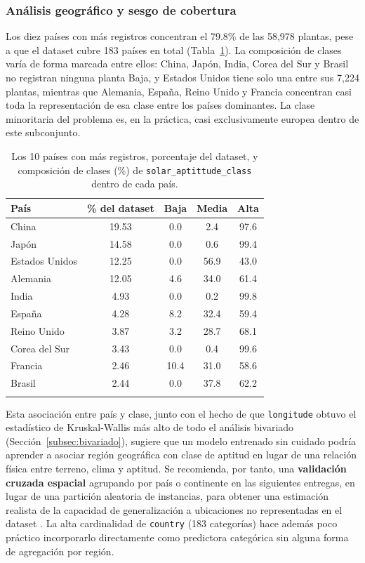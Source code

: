 \documentclass[pdflatex,sn-mathphys-num]{sn-jnl}
\begin{document}
\subsubsection{Análisis geográfico y sesgo de cobertura}\label{subsec:geografico}

Los diez países con más registros concentran el 79.8\% de las 58{,}978 plantas, pese a que el dataset cubre 183 países en total (Tabla~\ref{tab:paises}). La composición de clases varía de forma marcada entre ellos: China, Japón, India, Corea del Sur y Brasil no registran ninguna planta Baja, y Estados Unidos tiene solo una entre sus 7{,}224 plantas, mientras que Alemania, España, Reino Unido y Francia concentran casi toda la representación de esa clase entre los países dominantes. La clase minoritaria del problema es, en la práctica, casi exclusivamente europea dentro de este subconjunto.

\begin{table}[h]
\caption{Los 10 países con más registros, porcentaje del dataset, y composición de clases (\%) de \texttt{solar\_aptittude\_class} dentro de cada país.}\label{tab:paises}
\begin{tabular}{@{}lcccc@{}}
\toprule
País & \% del dataset & Baja & Media & Alta \\
\midrule
China          & 19.53 & 0.0  & 2.4  & 97.6 \\
Japón          & 14.58 & 0.0  & 0.6  & 99.4 \\
Estados Unidos & 12.25 & 0.0  & 56.9 & 43.0 \\
Alemania       & 12.05 & 4.6  & 34.0 & 61.4 \\
India          & 4.93  & 0.0  & 0.2  & 99.8 \\
España         & 4.28  & 8.2  & 32.4 & 59.4 \\
Reino Unido    & 3.87  & 3.2  & 28.7 & 68.1 \\
Corea del Sur  & 3.43  & 0.0  & 0.4  & 99.6 \\
Francia        & 2.46  & 10.4 & 31.0 & 58.6 \\
Brasil         & 2.44  & 0.0  & 37.8 & 62.2 \\
\botrule
\end{tabular}
\end{table}

Esta asociación entre país y clase, junto con el hecho de que \texttt{longitude} obtuvo el estadístico de Kruskal-Wallis más alto de todo el análisis bivariado (Sección~\ref{subsec:bivariado}), sugiere que un modelo entrenado sin cuidado podría aprender a asociar región geográfica con clase de aptitud en lugar de una relación física entre terreno, clima y aptitud. Se recomienda, por tanto, una \textbf{validación cruzada espacial} agrupando por país o continente en las siguientes entregas, en lugar de una partición aleatoria de instancias, para obtener una estimación realista de la capacidad de generalización a ubicaciones no representadas en el dataset \cite{bib2}. La alta cardinalidad de \texttt{country} (183 categorías) hace además poco práctico incorporarlo directamente como predictora categórica sin alguna forma de agregación por región.
\end{document}

